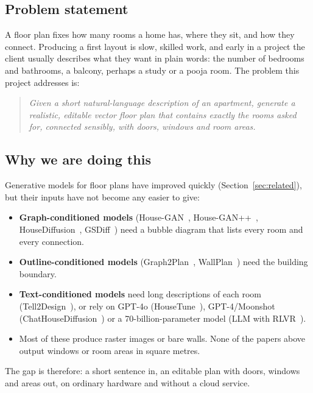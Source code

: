 \documentclass[11pt,a4paper]{article}
\begin{document}
\subsection{Problem statement}
A floor plan fixes how many rooms a home has, where they sit, and how they
connect. Producing a first layout is slow, skilled work, and early in a project
the client usually describes what they want in plain words: the number of
bedrooms and bathrooms, a balcony, perhaps a study or a pooja room. The problem
this project addresses is:

\begin{quote}
\emph{Given a short natural-language description of an apartment, generate a
realistic, editable vector floor plan that contains exactly the rooms asked for,
connected sensibly, with doors, windows and room areas.}
\end{quote}

\subsection{Why we are doing this}
Generative models for floor plans have improved quickly (Section~\ref{sec:related}),
but their inputs have not become any easier to give:
\begin{itemize}
  \item \textbf{Graph-conditioned models} (House-GAN~\cite{housegan},
        House-GAN++~\cite{housegan2}, HouseDiffusion~\cite{housediffusion},
        GSDiff~\cite{gsdiff}) need a bubble diagram that lists every room and
        every connection.
  \item \textbf{Outline-conditioned models} (Graph2Plan~\cite{graph2plan},
        WallPlan~\cite{wallplan}) need the building boundary.
  \item \textbf{Text-conditioned models} need long descriptions of each room
        (Tell2Design~\cite{tell2design}), or rely on GPT-4o (HouseTune~\cite{housetune}),
        GPT-4/Moonshot (ChatHouseDiffusion~\cite{chathousediffusion}) or a
        70-billion-parameter model (LLM with RLVR~\cite{rlvr}).
  \item Most of these produce raster images or bare walls. None of the papers
        above output windows or room areas in square metres.
\end{itemize}
The gap is therefore: a short sentence in, an editable plan with doors, windows
and areas out, on ordinary hardware and without a cloud service.
\end{document}
